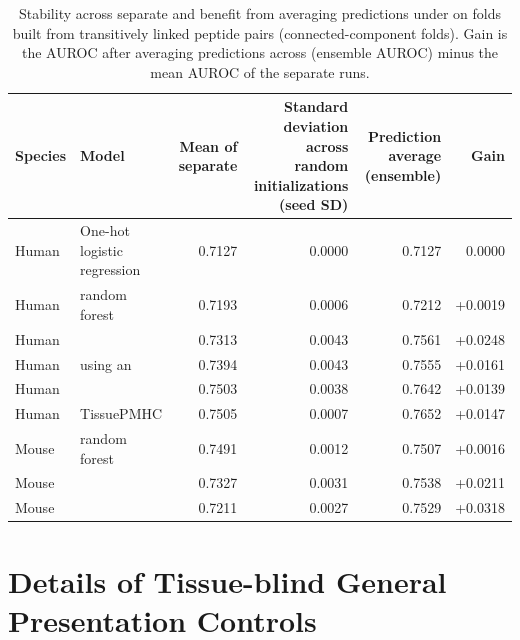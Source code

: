 \begin{table}[htbp]
\centering
\caption{Stability across separate \plainSeeds{} and benefit from averaging predictions under \plainPeptideOOF{} on folds built from transitively linked peptide pairs (connected-component folds). Gain is the AUROC after averaging predictions across \plainSeeds{} (ensemble AUROC) minus the mean AUROC of the separate runs.}
\label{tab:appendix-strict-seeds}
\footnotesize
\setlength{\tabcolsep}{2pt}
\begin{tabularx}{\textwidth}{>{\raggedright\arraybackslash}p{1.0cm}
                            >{\raggedright\arraybackslash}Xrrrr}
\toprule
Species & Model & Mean of separate \plainSeeds{} & \shortstack{Standard deviation across\\random initializations (seed SD)} & Prediction average (ensemble) & Gain \\
\midrule
Human & One-hot logistic regression & 0.7127 & 0.0000 & 0.7127 & 0.0000 \\
Human & \plainBLOSUM{} random forest & 0.7193 & 0.0006 & 0.7212 & +0.0019 \\
Human & \plainSharedHeads{} & 0.7313 & 0.0043 & 0.7561 & +0.0248 \\
Human & \plainPlainDual{} using an \plainMLP{} & 0.7394 & 0.0043 & 0.7555 & +0.0161 \\
Human & \plainAuxDual{} & 0.7503 & 0.0038 & 0.7642 & +0.0139 \\
Human & TissuePMHC & 0.7505 & 0.0007 & 0.7652 & +0.0147 \\
Mouse & \plainBLOSUM{} random forest & 0.7491 & 0.0012 & 0.7507 & +0.0016 \\
Mouse & \plainSharedHeads{} & 0.7327 & 0.0031 & 0.7538 & +0.0211 \\
Mouse & \plainMMoE{} & 0.7211 & 0.0027 & 0.7529 & +0.0318 \\
\bottomrule
\end{tabularx}
\end{table}

\clearpage
\section{Details of Tissue-blind General Presentation Controls}

